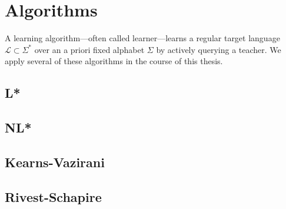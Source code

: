 \section{Algorithms}\label{section:learner_learning}
A learning algorithm—often called learner—learns a regular target 
language $\mathcal{L} \subset \Sigma^{*}$ over an a priori fixed alphabet $\Sigma$ by actively querying a teacher.
We apply several of these algorithms in the course of this thesis.
\subsection{L*}
\subsection{NL*}
\subsection{Kearns-Vazirani}
\subsection{Rivest-Schapire}